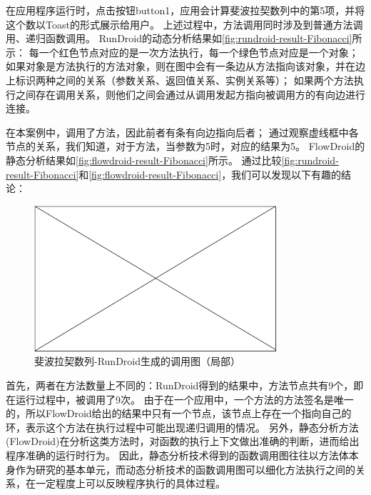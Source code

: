 在应用程序运行时，点击按钮button1，应用会计算斐波拉契数列中的第5项，并将这个数以Toast的形式展示给用户。
上述过程中，方法调用同时涉及到普通方法调用、递归函数调用。
RunDroid的动态分析结果如\autoref{fig:rundroid-result-Fibonacci}所示：
每一个红色节点对应的是一次方法执行，每一个绿色节点对应是一个对象；
如果对象是方法执行的方法对象，则在图中会有一条边从方法指向该对象，并在边上标识两种之间的关系（参数关系、返回值关系、实例关系等）；
如果两个方法执行之间存在调用关系，则他们之间会通过从调用发起方指向被调用方的有向边进行连接。

在本案例中，调用了方法，因此前者有条有向边指向后者；
通过观察虚线框中各节点的关系，我们知道，对于方法，当参数为5时，对应的结果为5。
FlowDroid的静态分析结果如\autoref{fig:flowdroid-result-Fibonacci}所示。
通过比较\autoref{fig:rundroid-result-Fibonacci}和\autoref{fig:flowdroid-result-Fibonacci}，我们可以发现以下有趣的结论：


\begin{figure}[!ht]
	\centering
	\includegraphics[width=0.8\textwidth]{./Figures/empty.png}
	\caption{斐波拉契数列-RunDroid生成的调用图（局部）}
	\label{fig:rundroid-result-Fibonacci}
\end{figure}

首先，两者在方法数量上不同的：RunDroid得到的结果中，方法节点共有9个，即在运行过程中，被调用了9次。
由于在一个应用中，一个方法的方法签名是唯一的，所以FlowDroid给出的结果中只有一个节点，该节点上存在一个指向自己的环，表示这个方法在执行过程中可能出现递归调用的情况。
另外，静态分析方法(FlowDroid)在分析这类方法时，对函数的执行上下文做出准确的判断，进而给出程序准确的运行时行为。
因此，静态分析技术得到的函数调用图往往以方法体本身作为研究的基本单元，而动态分析技术的函数调用图可以细化方法执行之间的关系，在一定程度上可以反映程序执行的具体过程。



